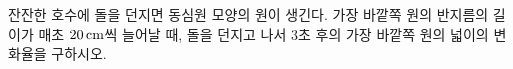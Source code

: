 잔잔한 호수에 돌을 던지면 동심원 모양의 원이 생긴다. 가장 바깥쪽 원의 반지름의 길이가 매초 $20\mkern3mu \mathrm{cm}$씩 늘어날 때, 돌을 던지고 나서 $3$초 후의 가장 바깥쪽 원의 넓이의 변화율을 구하시오.
